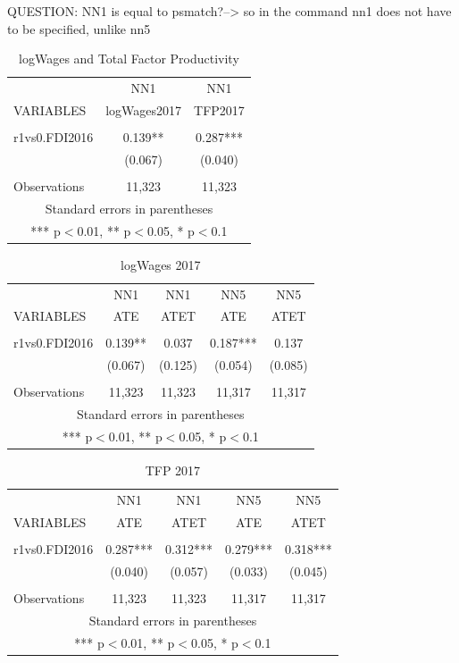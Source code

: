 \documentclass[a4paper,11pt]{scrartcl}
\begin{document}
QUESTION: NN1 is equal to psmatch?--> so in the command nn1 does not have to be specified, unlike nn5

\begin{table}[htbp]\centering
\caption{logWages and Total Factor Productivity}
\begin{tabular}{lcc} \hline
 &NN1 & NN1\\
VARIABLES & logWages2017 & TFP2017 \\ \hline
 &  &  \\
r1vs0.FDI2016 & 0.139** & 0.287*** \\
 & (0.067) & (0.040) \\
 &  &  \\
 Observations & 11,323 & 11,323 \\ \hline
\multicolumn{3}{c}{ Standard errors in parentheses} \\
\multicolumn{3}{c}{ *** p$<$0.01, ** p$<$0.05, * p$<$0.1} \\
\end{tabular}
\end{table}


\begin{table}[htbp]\centering
\caption{logWages 2017}
\begin{tabular}{lcccc} \hline
 & NN1 & NN1 & NN5 & NN5 \\
VARIABLES & ATE & ATET & ATE & ATET\\ \hline
 &  &  &  &  \\
r1vs0.FDI2016 & 0.139** & 0.037 & 0.187*** & 0.137 \\
 & (0.067) & (0.125) & (0.054) & (0.085) \\
 &  &  &  &  \\
 Observations & 11,323 & 11,323 & 11,317 & 11,317 \\ \hline
\multicolumn{5}{c}{ Standard errors in parentheses} \\
\multicolumn{5}{c}{ *** p$<$0.01, ** p$<$0.05, * p$<$0.1} \\
\end{tabular}
\end{table}

\begin{table}[htbp]\centering
\caption{TFP 2017}
\begin{tabular}{lcccc} \hline
 & NN1 & NN1 & NN5 & NN5 \\
VARIABLES & ATE & ATET & ATE & ATET \\ \hline
 &  &  &  &  \\
r1vs0.FDI2016 & 0.287*** & 0.312*** & 0.279*** & 0.318*** \\
 & (0.040) & (0.057) & (0.033) & (0.045) \\
 &  &  &  &  \\
 Observations & 11,323 & 11,323 & 11,317 & 11,317 \\ \hline
\multicolumn{5}{c}{ Standard errors in parentheses} \\
\multicolumn{5}{c}{ *** p$<$0.01, ** p$<$0.05, * p$<$0.1} \\
\end{tabular}
\end{table}
\end{document}
